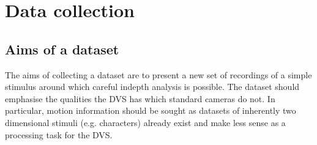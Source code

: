 \chapter{Data collection}

\section{Aims of a dataset}
The aims of collecting a dataset are to present a new set of recordings of a simple stimulus around which careful indepth analysis is possible. 
The dataset should emphasise the qualities the DVS has which standard cameras do not. 
In particular, motion information should be sought as datasets of inherently two dimensional stimuli (e.g. characters) already exist and make less sense as a processing task for the DVS.



